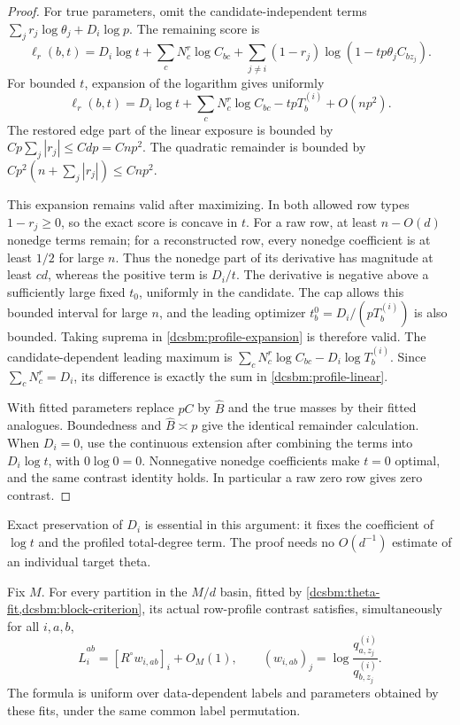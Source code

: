 \begin{proof}
For true parameters, omit the candidate-independent terms
\(\sum_jr_j\log\theta_j+D_i\log p\).  The remaining score is
\[
 \ell_r(b,t)
 =D_i\log t+\sum_cN_c^r\log C_{bc}
   +\sum_{j\ne i}(1-r_j)\log(1-tp\theta_jC_{bz_j}).
\]
For bounded \(t\), expansion of the logarithm gives uniformly
\begin{equation}
 \ell_r(b,t)
 =D_i\log t+\sum_cN_c^r\log C_{bc}-tpT_b^{(i)}
     +O(np^2).
 \label{dcsbm:profile-expansion}
\end{equation}
The restored edge part of the linear exposure is bounded by
\(Cp\sum_j|r_j|\le Cdp=Cnp^2\).
The quadratic remainder is bounded by
\(Cp^2(n+\sum_j|r_j|)\le Cnp^2\).

This expansion remains valid after maximizing.  In both allowed
row types \(1-r_j\ge0\), so the exact score is concave in \(t\).
For a raw row, at least \(n-O(d)\) nonedge terms remain; for a
reconstructed row, every nonedge coefficient is at least \(1/2\)
for large \(n\).  Thus the nonedge part of its derivative has
magnitude at least \(cd\), whereas the positive term is \(D_i/t\).
The derivative is negative above a sufficiently large fixed \(t_0\),
uniformly in the candidate.  The cap allows this bounded interval
for large \(n\), and the leading optimizer
\(t_b^0=D_i/(pT_b^{(i)})\) is also bounded.
Taking suprema in \cref{dcsbm:profile-expansion} is therefore valid.
The candidate-dependent leading maximum is
\(\sum_cN_c^r\log C_{bc}-D_i\log T_b^{(i)}\).
Since \(\sum_cN_c^r=D_i\), its difference is exactly the sum
in \cref{dcsbm:profile-linear}.

With fitted parameters replace \(pC\) by \(\widehat B\) and
the true masses by their fitted analogues.  Boundedness and
\(\widehat B\asymp p\) give the identical remainder calculation.
When \(D_i=0\), use the continuous extension after combining the
terms into \(D_i\log t\), with \(0\log0=0\).  Nonnegative nonedge
coefficients make \(t=0\) optimal, and the same contrast identity
holds.  In particular a raw zero row gives zero contrast.
\end{proof}

Exact preservation of \(D_i\) is essential in this argument:
it fixes the coefficient of \(\log t\) and the profiled total-degree
term.  The proof needs no \(O(d^{-1})\) estimate of an individual
target theta.

\begin{lemma}
\label{dcsbm:uniform-score}
Fix \(M\).  For every partition in the \(M/d\) basin, fitted by
\cref{dcsbm:theta-fit,dcsbm:block-criterion}, its actual row-profile
contrast satisfies, simultaneously for all \(i,a,b\),
\begin{equation}
 \widehat L_i^{ab}
 =[R^\circ w_{i,ab}]_i+O_M(1),\qquad
 (w_{i,ab})_j=\log\frac{q_{a,z_j}^{(i)}}{q_{b,z_j}^{(i)}} .
 \label{dcsbm:uniform-contrast}
\end{equation}
The formula is uniform over data-dependent labels and parameters
obtained by these fits, under the same common label permutation.
\end{lemma}


